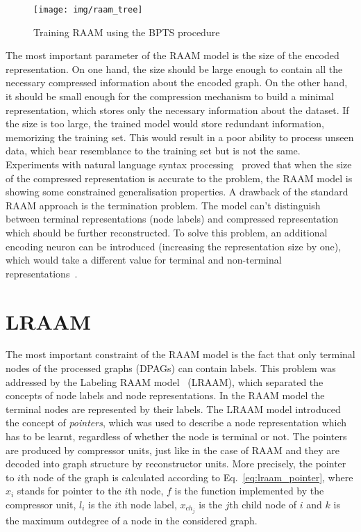 \begin{figure}
\begin{center}
	\texttt{[image: img/raam\_tree]}
	\caption{Training RAAM using the BPTS procedure}
	\label{fig:raam_tree}
\end{center}
\end{figure}

The most important parameter of the RAAM model is the size of the encoded representation. On one hand, the size should be large enough to contain all the necessary compressed information about the encoded graph. On the other hand, it should be small enough for the compression mechanism to build a minimal representation, which stores only the necessary information about the dataset. If the size is too large, the trained model would store redundant information, memorizing the training set. This would result in a poor ability to process unseen data, which bear resemblance to the training set but is not the same. Experiments with natural language syntax processing~\cite{pollack1990recursive} proved that when the size of the compressed representation is accurate to the problem, the RAAM model is showing some constrained generalisation properties. A drawback of the standard RAAM approach is the termination problem. The model can't distinguish between terminal representations (node labels) and compressed representation which should be further reconstructed. To solve this problem, an additional encoding neuron can be introduced (increasing the representation size by one), which would take a different value for terminal and non-terminal representations~\cite{stolcke1992tree}.

\section{LRAAM}
The most important constraint of the RAAM model is the fact that only terminal nodes of the processed graphs (DPAGs) can contain labels. This problem was addressed by the Labeling RAAM model~\cite{sperduti1994labelling} (LRAAM), which separated the concepts of node labels and node representations. In the RAAM model the terminal nodes are represented by their labels. The LRAAM model introduced the concept of \emph{pointers}, which was used to describe a node representation which has to be learnt, regardless of whether the node is terminal or not. The pointers are produced by compressor units, just like in the case of RAAM and they are decoded into graph structure by reconstructor units. More precisely, the pointer to $i$th node of the graph is calculated according to Eq.~\ref{eq:lraam_pointer}, where $x_i$ stands for pointer to the $i$th node, $f$ is the function implemented by the compressor unit, $l_i$ is the $i$th node label, $x_{ch_j}$ is the $j$th child node of $i$ and $k$ is the maximum outdegree of a node in the considered graph.

